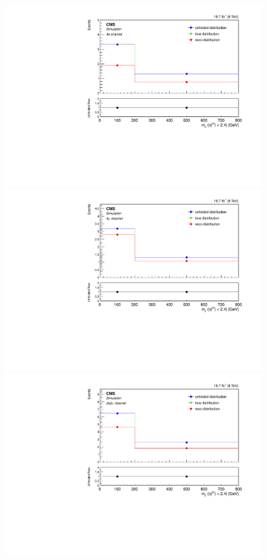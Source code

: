 \begin{figure}[hbtp]
\begin{center}
     \includegraphics[width=0.8\cmsFigWidth]{Figures/Unfolding/MCTests/CentralMjj_ZZTo4e_PowMatrix_PowDistr_FullSample_fr}     
    \includegraphics[width=0.8\cmsFigWidth]{Figures/Unfolding/MCTests/CentralMjj_ZZTo4m_PowMatrix_PowDistr_FullSample_fr}     
    \includegraphics[width=0.8\cmsFigWidth]{Figures/Unfolding/MCTests/CentralMjj_ZZTo2e2m_PowMatrix_PowDistr_FullSample_fr}      

\end{center}
\end{figure}
